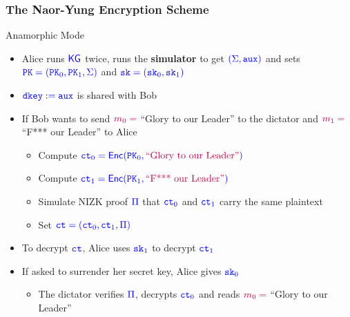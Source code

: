 \documentclass[]{beamer}
\newcommand{\algofont}[1]{{\mathsf{#1}}}
\newcommand{\objfont}[1]{{\mathtt{#1}}}
\newcommand{\kg}{\algofont{KG}}
\newcommand{\enc}{\algofont{Enc}}
\newcommand{\ct}{\objfont{ct}}      %
\newcommand{\pk}{\objfont{PK}}      %
\newcommand{\sk}{\objfont{sk}}      %
\newcommand{\dkey}{\objfont{dkey}}  %
\begin{document}
\begin{frame}
\frametitle{The Naor-Yung Encryption Scheme}
\begin{exampleblock}{Anamorphic Mode}
\begin{itemize}
\item Alice runs $\color{blue} \kg$ twice, runs the 
{\color{teal}\bf simulator} to get $\color{blue}(\Sigma,\mathtt{aux})$ 
and sets $\color{blue} \pk=(\pk_0,\pk_1,\Sigma)$ and $\color{blue} \sk=(\sk_0,\sk_1)$
\item $\color{blue}\dkey:=\mathtt{aux}$ is shared with Bob
\item If Bob wants to send $\color{purple}m_0=${\color{purple} ``Glory to our Leader''} to the dictator
and $\color{purple}m_1=${\color{purple} ``F*** our Leader''} to Alice
    \begin{itemize}
    \item Compute $\color{blue} \ct_0=\enc(\pk_0,\text{\color{purple} ``Glory to our Leader''})$
    \item Compute $\color{blue} \ct_1=\enc(\pk_1,\text{\color{purple} ``F*** our Leader''})$
    \item Simulate NIZK proof $\color{blue} \Pi$ that $\color{blue} \ct_0$ and $\color{blue} \ct_1$ carry the same    
        plaintext
    \item Set $\color{blue} \ct=(\ct_0,\ct_1,\Pi)$
    \end{itemize}
\item To decrypt $\color{blue} \ct$, Alice uses $\color{blue} \sk_1$ to decrypt $\color{blue} \ct_1$
\item If asked to surrender her secret key, Alice gives $\color{blue} \sk_0$ 
    \begin{itemize}
    \item The dictator verifies $\color{blue} \Pi$, decrypts $\color{blue} \ct_0$ and reads
        $\color{purple}m_0=${\color{purple} ``Glory to our Leader''}
\end{itemize}
\end{itemize}
\end{exampleblock}
\end{frame}
\end{document}
